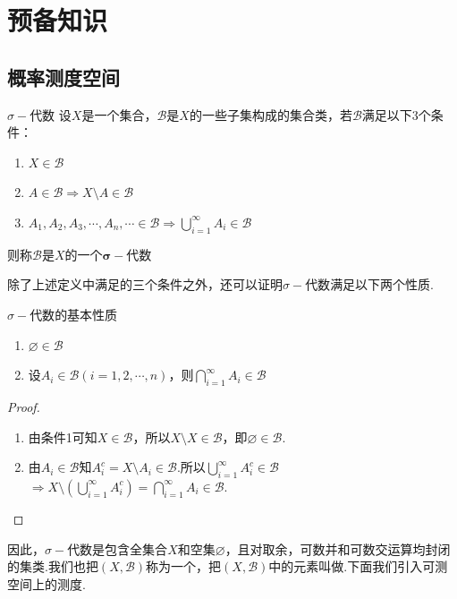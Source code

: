 \chapter{预备知识}

\section{概率测度空间}

\begin{definition}{$\sigma-$代数}
    设$X$是一个集合，$\mathcal{B}$是$X$的一些子集构成的集合类，若$\mathcal{B}$满足以下3个条件：
    \begin{enumerate}
        \item $X\in\mathcal{B}$
        \item $A\in\mathcal{B}\Rightarrow X\setminus A\in\mathcal{B}$
        \item $A_1,A_2,A_3,\cdots,A_n,\cdots\in\mathcal{B}\Rightarrow\bigcup_{i=1}^{\infty}{A_i\in\mathcal{B}}$
    \end{enumerate}
    则称$\mathcal{B}$是$X$的一个\textbf{$\bm{\sigma}-\text{代数}$}
\end{definition}

除了上述定义中满足的三个条件之外，还可以证明$\sigma-\text{代数}$满足以下两个性质.

\begin{proposition}{$\sigma-\text{代数}$的基本性质}
    \begin{enumerate}
        \item $\varnothing\in\mathcal{B}$
        \item 设$A_i\in\mathcal{B}(i=1,2,\cdots,n)$，则$\bigcap_{i=1}^{\infty}{A_i}\in\mathcal{B}$   
    \end{enumerate}
\end{proposition}
\begin{proof}
    \begin{enumerate}
        \item 由条件1可知$X\in\mathcal{B}$，所以$X\setminus X\in\mathcal{B}$，即$\varnothing\in\mathcal{B}$.
        \item 由$A_i\in\mathcal{B}$知$A_i^c=X\setminus A_i \in\mathcal{B}$.所以$\bigcup_{i=1}^\infty{A_i^c}\in\mathcal{B}$
        $\Rightarrow X\setminus\left(\bigcup_{i=1}^\infty{A_i^c}\right)=\bigcap_{i=1}^\infty{A_i}\in\mathcal{B}$.
    \end{enumerate}
\end{proof}

因此，$\sigma-$代数是包含全集合$X$和空集$\varnothing$，且对取余，可数并和可数交运算均封闭的集类.我们也把$(X,\mathcal{B})$称为一个，把$(X,\mathcal{B})$中的元素叫做.下面我们引入可测空间上的测度.

